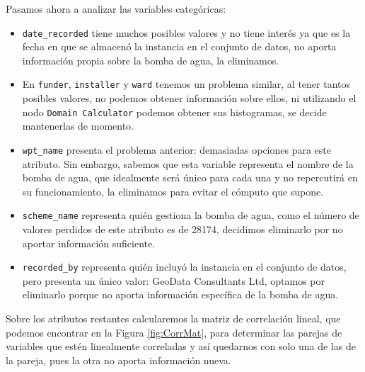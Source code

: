 \documentclass[a4paper, 20pt]{article}
\begin{document}
Pasamos ahora a analizar las variables categóricas:
\begin{itemize}
\item \texttt{date\_recorded} tiene muchos posibles valores y no tiene interés ya que es la fecha en que se almacenó la instancia en el conjunto de datos, no aporta información propia sobre la bomba de agua, la eliminamos.
\item En \texttt{funder}, \texttt{installer} y \texttt{ward} tenemos un problema similar, al tener tantos posibles valores, no podemos obtener información sobre ellos, ni utilizando el nodo \texttt{Domain Calculator} podemos obtener sus histogramas, se decide mantenerlas de momento.
\item \texttt{wpt\_name} presenta el problema anterior: demasiadas opciones para este atributo. Sin embargo, sabemos que esta variable representa el nombre de la bomba de agua, que idealmente será único para cada una y no repercutirá en su funcionamiento, la eliminamos para evitar el cómputo que supone.
\item \texttt{scheme\_name} representa quién gestiona la bomba de agua, como el número de valores perdidos de este atributo es de 28174, decidimos eliminarlo por no aportar información suficiente. 
\item \texttt{recorded\_by} representa quién incluyó la instancia en el conjunto de datos, pero presenta un único valor: GeoData Consultants Ltd, optamos por eliminarlo porque no aporta información específica de la bomba de agua.
\end{itemize}

Sobre los atributos restantes calcularemos la matriz de correlación lineal, que podemos encontrar en la Figura \ref{fig:CorrMat}, para determinar las parejas de variables que estén linealmente correladas y así quedarnos con solo una de las de la pareja, pues la otra no aporta información nueva.

\end{document}

